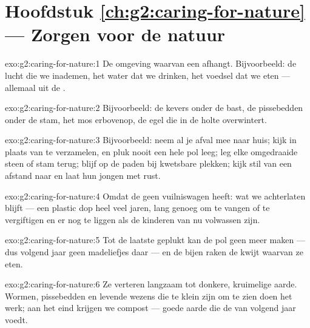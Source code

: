 \section*{Hoofdstuk \ref{ch:g2:caring-for-nature} --- Zorgen voor de natuur}

\begin{solution}{exo:g2:caring-for-nature:1}
De omgeving waarvan een  afhangt. Bijvoorbeeld: de lucht
die we inademen, het water dat we drinken, het voedsel dat we eten ---
allemaal uit de .
\end{solution}

\begin{solution}{exo:g2:caring-for-nature:2}
Bijvoorbeeld: de kevers onder de bast, de pissebedden onder de stam,
het mos erbovenop, de egel die in de holte overwintert.
\end{solution}

\begin{solution}{exo:g2:caring-for-nature:3}
Bijvoorbeeld: neem al je afval mee naar huis; kijk in plaats van te
verzamelen, en pluk nooit een hele pol leeg; leg elke omgedraaide steen
of stam terug; blijf op de paden bij kwetsbare plekken; kijk stil van
een afstand naar  en laat hun jongen met rust.
\end{solution}

\begin{solution}{exo:g2:caring-for-nature:4}
Omdat de  geen vuilniswagen heeft: wat we achterlaten blijft ---
een plastic dop heel veel jaren, lang genoeg om  te vangen of te
vergiftigen en er nog te liggen als de kinderen van nu volwassen zijn.
\end{solution}

\begin{solution}{exo:g2:caring-for-nature:5}
Tot de laatste geplukt kan de pol geen  meer maken --- dus volgend
jaar geen madeliefjes daar --- en de bijen raken de  kwijt
waarvan ze eten.
\end{solution}

\begin{solution}{exo:g2:caring-for-nature:6}
Ze verteren langzaam tot donkere, kruimelige aarde. Wormen, pissebedden
en levende wezens die te klein zijn om te zien doen het werk; aan het
eind krijgen we compost --- goede aarde die de  van volgend jaar voedt.
\end{solution}

